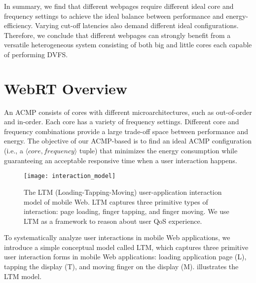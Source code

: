 In summary, we find that different webpages require different ideal core and frequency settings to achieve the ideal balance between performance and energy-efficiency. Varying cut-off latencies also demand different ideal configurations. Therefore, we conclude that different webpages can strongly benefit from a versatile heterogeneous system consisting of both big and little cores each capable of performing DVFS.

\section{WebRT Overview}
\label{sec:runtime:overview}

An ACMP consists of cores with different microarchitectures, such as out-of-order and in-order. Each core has a variety of frequency settings. Different core and frequency combinations provide a large trade-off space between performance and energy. The objective of our ACMP-based \webrt is to find an ideal ACMP configuration (i.e., a $\langle core, frequency \rangle$ tuple) that minimizes the energy consumption while guaranteeing an acceptable responsive time when a user interaction happens.


\begin{figure}[t]
  \centering
  \texttt{[image: interaction\_model]}
  \caption{The LTM (Loading-Tapping-Moving) user-application interaction model of mobile Web. LTM captures three primitive types of interaction: page loading, finger tapping, and finger moving. We use LTM as a framework to reason about user QoS experience.}
  \label{fig:interaction}
\end{figure}

To systematically analyze user interactions in mobile Web applications, we introduce a simple conceptual model called LTM, which captures three primitive user interaction forms in mobile Web applications: loading application page (L), tapping the display (T), and moving finger on the display (M).  illustrates the LTM model.

